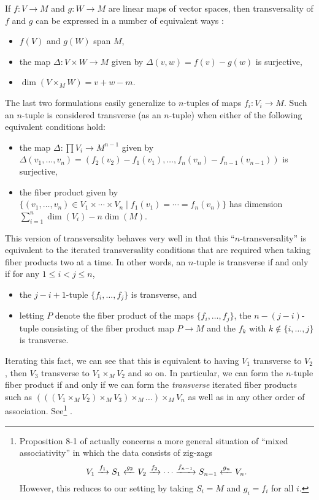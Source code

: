 \begin{remark}
	If $f \colon V \to M$ and $g \colon W \to M$ are linear maps of vector spaces, then transversality of $f$ and $g$ can be expressed in a number of equivalent ways \cite[Section 4.7]{RamBas09}:
	\begin{itemize}
		\item $f(V)$ and $g(W)$ span $M$,
		\item the map $\Delta \colon V \times W \to M$ given by $\Delta(v,w) = f(v)-g(w)$ is surjective,
		\item $\dim(V \times_MW) = v+w-m$.
	\end{itemize}
	The last two formulations easily generalize to $n$-tuples of maps $f_i \colon V_i \to M$.
	Such an $n$-tuple is considered transverse (as an $n$-tuple) when either of the following equivalent conditions hold:
	\begin{itemize}
		\item the map $\Delta \colon \prod V_i \to M^{n-1}$ given by $\Delta(v_1,\ldots,v_n) = (f_2(v_2)-f_1(v_1),\ldots, f_n(v_n)-f_{n-1}(v_{n-1}))$ is surjective,
		\item the fiber product given by $\{(v_1,\ldots,v_n) \in V_1 \times \cdots \times V_n \mid f_1(v_1) = \cdots = f_n(v_n)\}$ has dimension $\sum_{i = 1}^n\dim(V_i) -n\dim(M)$.
	\end{itemize}
	This version of transversality behaves very well in that this ``$n$-transversality'' is equivalent to the iterated transversality conditions that are required when taking fiber products two at a time.
	In other words, an $n$-tuple is transverse if and only if for any $1 \leq i<j \leq n$,
	\begin{itemize}
		\item the $j-i+1$-tuple $\{f_i,\ldots,f_j\}$ is transverse, and
		\item letting $P$ denote the fiber product of the maps $\{f_i,\ldots,f_j\}$, the $n-(j-i)$-tuple consisting of the fiber product map $P \to M$ and the $f_k$ with $k\notin\{i,\ldots,j\}$ is transverse.
	\end{itemize}
	Iterating this fact, we can see that this is equivalent to having $V_1$ transverse to $V_2$, then $V_3$ transverse to $V_1 \times_MV_2$ and so on.
	In particular, we can form the $n$-tuple fiber product if and only if we can form the \textit{transverse} iterated fiber products such as $(((V_1 \times_MV_2) \times_M V_3) \times_M\ldots) \times_M V_n$ as well as in any other order of association.
	See\footnote{Proposition 8-1 of \cite{RamBas09} actually concerns a more general situation of ``mixed associativity'' in which the data consists of zig-zags
	$$V_1 \xrightarrow{f_1}S_1\xleftarrow{g_2}V_2 \xrightarrow{f_2}\cdots \xrightarrow{f_{n-1}}S_{n-1}\xleftarrow{g_n}V_n.$$
	However, this reduces to our setting by taking $S_i = M$ and $g_i = f_i$ for all $i$.}
	\cite[Propositions~4-9 and 8-1]{RamBas09}.


\end{remark}
